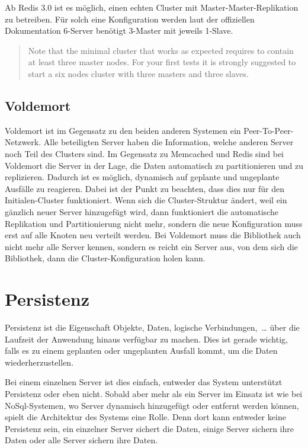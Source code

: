 Ab Redis 3.0 ist es möglich, einen echten Cluster mit Master-Master-Replikation
zu betreiben. Für solch eine Konfiguration werden laut der offiziellen
Dokumentation 6-Server benötigt 3-Master mit jeweils 1-Slave.

\foreignblockquote{english}[\cite{Redis2017}]{Note that the minimal cluster
that works as expected requires to contain at least three master nodes. For your
first tests it is strongly suggested to start a six nodes cluster with three
masters and three slaves.}

\subsection{Voldemort}
Voldemort ist im Gegensatz zu den beiden anderen Systemen ein
Peer-To-Peer-Netzwerk. Alle beteiligten Server haben die Information, welche
anderen Server noch Teil des Clusters sind. Im Gegensatz zu Memcached und Redis
sind bei Voldemort die Server in der Lage, die Daten automatisch zu
partitionieren und zu replizieren. Dadurch ist es möglich, dynamisch auf
geplante und ungeplante Ausfälle zu reagieren. Dabei ist der Punkt zu beachten,
dass dies nur für den Initialen-Cluster funktioniert. Wenn sich die
Cluster-Struktur ändert, weil ein gänzlich neuer Server hinzugefügt wird, dann
funktioniert die automatische Replikation und Partitionierung nicht mehr,
sondern die neue Konfiguration muss erst auf alle Knoten neu verteilt werden.
Bei Voldemort muss die Bibliothek auch nicht mehr alle Server kennen, sondern es
reicht ein Server aus, von dem sich die Bibliothek, dann die
Cluster-Konfiguration holen kann.

\section{Persistenz}
Persistenz ist die Eigenschaft Objekte, Daten, logische Verbindungen,~\dots{}
über die Laufzeit der Anwendung hinaus verfügbar zu machen. Dies ist gerade
wichtig, falls es zu einem geplanten oder ungeplanten Ausfall kommt, um die
Daten wiederherzustellen.

Bei einem einzelnen Server ist dies einfach, entweder das System unterstützt
Persistenz oder eben nicht. Sobald aber mehr als ein Server im Einsatz ist wie
bei NoSql-Systemen, wo Server dynamisch hinzugefügt oder entfernt werden können,
spielt die Architektur des Systems eine Rolle. Denn dort kann entweder keine
Persistenz sein, ein einzelner Server sichert die Daten, einige Server sichern
ihre Daten oder alle Server sichern ihre Daten.

